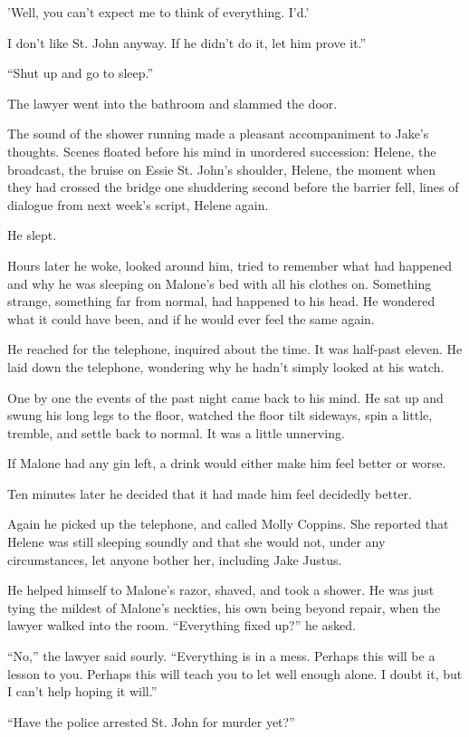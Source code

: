 \documentclass{novel}
\begin{document}
'Well, you can’t expect me to think of everything. I'd.'

I don’t like St. John anyway. If he didn’t do it, let him prove it.”

“Shut up and go to sleep.”

The lawyer went into the bathroom and slammed the door.

The sound of the shower running made a pleasant accompaniment to Jake’s thoughts. Scenes floated before his mind in unordered succession: Helene, the broadcast, the bruise on Essie St. John’s shoulder, Helene, the moment when they had crossed the bridge one shuddering second before the barrier fell, lines of dialogue from next week’s script, Helene again.

He slept.

Hours later he woke, looked around him, tried to remember what had happened and why he was sleeping on Malone’s bed with all his clothes on. Something strange, something far from normal, had happened to his head. He wondered what it could have been, and if he would ever feel the same again.

He reached for the telephone, inquired about the time. It was half-past eleven. He laid down the telephone, wondering why he hadn’t simply looked at his watch.

One by one the events of the past night came back to his mind. He sat up and swung his long legs to the floor, watched the floor tilt sideways, spin a little, tremble, and settle back to normal. It was a little unnerving.

If Malone had any gin left, a drink would either make him feel better or worse.

Ten minutes later he decided that it had made him feel decidedly better.

Again he picked up the telephone, and called Molly Coppins. She reported that Helene was still sleeping soundly and that she would not, under any circumstances, let anyone bother her, including Jake Justus.

He helped himself to Malone’s razor, shaved, and took a shower. He was just tying the mildest of Malone’s neckties, his own being beyond repair, when the lawyer walked into the room. “Everything fixed up?” he asked.

“No,” the lawyer said sourly. “Everything is in a mess. Perhaps this will be a lesson to you. Perhaps this will teach you to let well enough alone. I doubt it, but I can’t help hoping it will.”

“Have the police arrested St. John for murder yet?”
\end{document}
